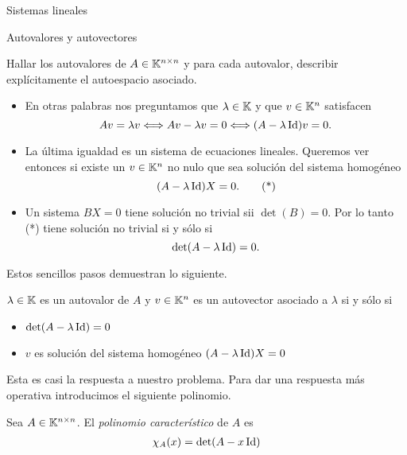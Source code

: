\begin{chapter}{Sistemas lineales}
\begin{section}{Autovalores y autovectores}
        
        \begin{problema*}
        Hallar los autovalores de $A\in\mathbb K^{n\times n}$ y para cada autovalor, describir explícitamente el autoespacio asociado.
    \end{problema*}
        
        \begin{itemize}
            \item En otras palabras nos preguntamos que $\lambda\in\mathbb K$ y  que $v\in\mathbb K^{n}$ satisfacen
            $$
            Av=\lambda v
            \Longleftrightarrow
            Av-\lambda v=0
            \Longleftrightarrow
            (A-\lambda \operatorname{Id})v=0 .
            $$
            \item La última igualdad es un sistema de ecuaciones lineales. Queremos ver entonces si existe un $v\in\mathbb K^{n}$ no nulo que sea solución del sistema homogéneo
            \begin{equation*}
                (A-\lambda \operatorname{Id})X=0.\tag{*}
            \end{equation*}
            \item  Un  sistema $BX =0$ tiene solución no trivial sii $\det(B)=0$. Por lo tanto (*) tiene  solución no trivial si y sólo si 
            $$
            \det(A-\lambda \operatorname{Id})=0.
            $$ 
        \end{itemize}
        
        Estos sencillos pasos demuestran  lo siguiente.

        \begin{proposicion}
        $\lambda\in\mathbb K$ es un autovalor de $A$ y $v\in\mathbb K^n$ es un autovector asociado a $\lambda$ si y sólo si
    
        \begin{itemize}
         \item $\det(A-\lambda \operatorname{Id})=0$
         \item $v$ es solución del sistema homogéneo $(A-\lambda \operatorname{Id})X=0$
        \end{itemize}
    \end{proposicion}

        Esta es casi la respuesta a nuestro problema. Para dar una respuesta más operativa introducimos el siguiente polinomio.
         
        \begin{definicion}
        
        Sea $A\in\mathbb K^{n\times n}$. El \textit{polinomio característico} de $A$ es
        \begin{align*}
        \chi_A(x)=\det(A-x \operatorname{Id})
        \end{align*}
        \end{definicion}


\end{section}
\end{chapter}
